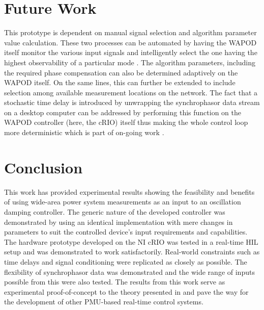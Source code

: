 \documentclass{ieeeaccess}
\begin{document}
\section{Future Work}\label{Future}

This prototype is dependent on manual signal selection and algorithm parameter value calculation. These two processes can be automated by having the WAPOD itself monitor the various input signals and intelligently select the one having the highest observability of a particular mode \cite{Yuwa}. The algorithm parameters, including the required phase compensation can also be determined adaptively on the WAPOD itself. On the same lines, this can further be extended to include selection among available measurement locations on the network. The fact that a stochastic time delay is introduced by unwrapping the synchrophasor data stream on a desktop computer can be addressed by performing this function on the WAPOD controller (here, the cRIO) itself thus making the whole control loop more deterministic which is part of on-going work \cite{Audur}. 

\section{Conclusion}\label{Conclusion}
This work has provided experimental results showing the feasibility and benefits of using wide-area power system measurements as an input to an oscillation damping controller. The generic nature of the developed controller was demonstrated by using an identical implementation with mere changes in parameters to suit the controlled device's input requirements and capabilities. The hardware prototype developed on the NI cRIO was tested in a real-time HIL setup and was demonstrated to work satisfactorily. Real-world constraints such as time delays and signal conditioning were replicated as closely as possible. The flexibility of synchrophasor data was demonstrated and the wide range of inputs possible from this were also tested. The results from this work serve as experimental proof-of-concept to the theory presented in \cite{Yuwa} and pave the way for the development of other PMU-based real-time control systems.
\end{document}
